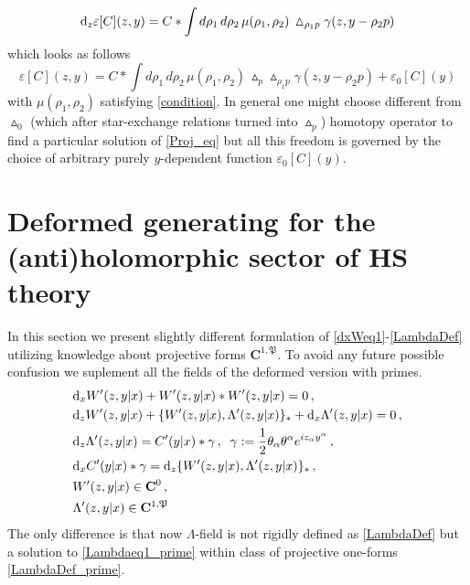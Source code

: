 \documentclass[12pt]{article}
\newcommand{\dr}{{{\rm d}}}
\newcommand{\gga}{\gamma}
\newcommand{\half}{\frac{1}{2}}
\newcommand{\hmt}{\vartriangle}
\begin{document}
\begin{equation}\label{Proj_eq}
\dr_z \varepsilon[C](z,y)=C\ast \int d\rho_1 \, d\rho_2 \, \mu(\rho_1,\rho_2)\, \hmt_{\rho_1 p}\gamma(z,y-\rho_2 p)
\end{equation}
which looks as follows
\begin{equation}\label{generic_form}
\varepsilon[C](z,y)=C\ast \int d\rho_1\, d\rho_2\, \mu(\rho_1,\rho_2)\, \hmt_p\hmt_{\rho_1 p}\gamma(z,y-\rho_2 p)+\varepsilon_0[C](y)
\end{equation}
with $\mu(\rho_1,\rho_2)$ satisfying \eqref{condition}. In general one might choose different from $\hmt_0$ (which after star-exchange relations \cite{Didenko:2018fgx} turned into $\hmt_p$) homotopy operator to find a particular solution of \eqref{Proj_eq} but all this freedom is governed by the choice of arbitrary purely $y$-dependent function $\varepsilon_0[C](y)$.

\section{Deformed generating for the (anti)holomorphic sector of HS theory}\label{Burn_mango}
In this section we present slightly different formulation of \eqref{dxWeq1}-\eqref{LambdaDef} utilizing knowledge about projective forms $\mathbf{C}^{1,\mathfrak{P}}$. To avoid any future possible confusion we suplement all the fields of the deformed version with primes.
\begin{align}
&\dr_{x} W^\prime(z,y|x)+W^\prime(z,y|x)*W^\prime(z,y|x)=0\,,\label{dxWeq1_prime}\\
&\dr_z W^\prime(z,y|x)+\{W^\prime(z,y|x),\Lambda^\prime(z,y|x)\}_{*}+\dr_x\Lambda^\prime(z,y|x)=0\,,\label{Weq11_prime}\\
&\dr_z\Lambda^\prime(z,y|x)=C^\prime(y|x)*\gga\,,\;\; \gamma:=\half\theta_\alpha\theta^\alpha e^{iz_\alpha y^\alpha}\,,\label{Lambdaeq1_prime}\\
&\dr_x C^\prime(y|x)*\gga=\dr_z\{W^\prime(z,y|x),\Lambda^\prime(z,y|x)\}_{*}\,,\label{Ceq1_prime}\\
&W^\prime(z,y|x)\in \mathbf{C}^0\, , \label{class1_prime}\\
&\Lambda^\prime(z,y|x) \in \mathbf{C}^{1,\mathfrak{P}}\label{LambdaDef_prime}
\end{align}
The only difference is that now $\Lambda$-field is not rigidly defined as \eqref{LambdaDef} but a solution to \eqref{Lambdaeq1_prime} within class of projective one-forms \eqref{LambdaDef_prime}.
\end{document}
